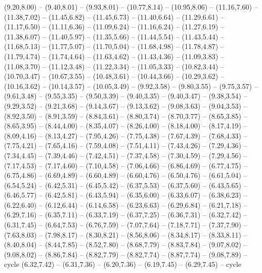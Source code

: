 \expandafter\def\csname geo:gebiet:1945-Poland\endcsname{
  (9.20,8.00) -- (9.40,8.01) -- (9.93,8.01) -- (10.77,8.14) -- (10.95,8.06) -- (11.16,7.60) -- (11.38,7.02) -- (11.45,6.82) -- (11.45,6.73) -- (11.40,6.64) -- (11.29,6.61) -- (11.17,6.50) -- (11.11,6.36) -- (11.09,6.24) -- (11.16,6.24) -- (11.27,6.19) -- (11.38,6.07) -- (11.40,5.97) -- (11.35,5.66) -- (11.44,5.54) -- (11.43,5.44) -- (11.68,5.13) -- (11.77,5.07) -- (11.70,5.04) -- (11.68,4.98) -- (11.78,4.87) -- (11.79,4.74) -- (11.74,4.64) -- (11.63,4.62) -- (11.43,4.36) -- (11.09,3.83) -- (11.08,3.70) -- (11.12,3.48) -- (11.22,3.34) -- (11.05,3.33) -- (10.82,3.44) -- (10.70,3.47) -- (10.67,3.55) -- (10.48,3.61) -- (10.44,3.66) -- (10.29,3.62) -- (10.16,3.62) -- (10.14,3.57) -- (10.05,3.49) -- (9.92,3.58) -- (9.80,3.55) -- (9.75,3.57) -- (9.61,3.48) -- (9.55,3.35) -- (9.50,3.39) -- (9.40,3.35) -- (9.40,3.47) -- (9.38,3.54) -- (9.29,3.52) -- (9.21,3.68) -- (9.14,3.67) -- (9.13,3.62) -- (9.08,3.63) -- (9.04,3.53) -- (8.92,3.50) -- (8.91,3.59) -- (8.84,3.61) -- (8.80,3.74) -- (8.70,3.77) -- (8.65,3.85) -- (8.65,3.95) -- (8.44,4.00) -- (8.35,4.07) -- (8.26,4.00) -- (8.18,4.00) -- (8.17,4.19) -- (8.09,4.16) -- (8.13,4.27) -- (7.95,4.26) -- (7.75,4.38) -- (7.67,4.39) -- (7.68,4.33) -- (7.75,4.21) -- (7.65,4.16) -- (7.59,4.08) -- (7.51,4.11) -- (7.43,4.26) -- (7.29,4.36) -- (7.34,4.45) -- (7.39,4.46) -- (7.42,4.51) -- (7.37,4.58) -- (7.30,4.59) -- (7.29,4.56) -- (7.17,4.53) -- (7.17,4.60) -- (7.10,4.58) -- (7.06,4.66) -- (6.86,4.69) -- (6.77,4.75) -- (6.75,4.86) -- (6.69,4.89) -- (6.60,4.89) -- (6.60,4.76) -- (6.50,4.76) -- (6.61,5.04) -- (6.54,5.24) -- (6.42,5.31) -- (6.45,5.42) -- (6.37,5.53) -- (6.37,5.60) -- (6.43,5.65) -- (6.46,5.77) -- (6.42,5.81) -- (6.43,5.94) -- (6.35,6.00) -- (6.33,6.07) -- (6.38,6.23) -- (6.22,6.40) -- (6.12,6.44) -- (6.14,6.58) -- (6.23,6.63) -- (6.29,6.84) -- (6.21,7.18) -- (6.29,7.16) -- (6.35,7.11) -- (6.33,7.19) -- (6.37,7.25) -- (6.36,7.31) -- (6.32,7.42) -- (6.31,7.45) -- (6.64,7.53) -- (6.76,7.59) -- (7.07,7.64) -- (7.18,7.71) -- (7.37,7.90) -- (7.63,8.03) -- (7.98,8.17) -- (8.30,8.21) -- (8.56,8.06) -- (8.34,8.17) -- (8.33,8.11) -- (8.40,8.04) -- (8.44,7.85) -- (8.52,7.80) -- (8.68,7.79) -- (8.83,7.84) -- (9.07,8.02) -- (9.08,8.02) -- (8.86,7.84) -- (8.82,7.79) -- (8.82,7.74) -- (8.87,7.74) -- (9.08,7.89) -- cycle
  (6.32,7.42) -- (6.31,7.36) -- (6.20,7.36) -- (6.19,7.45) -- (6.29,7.45) -- cycle}
